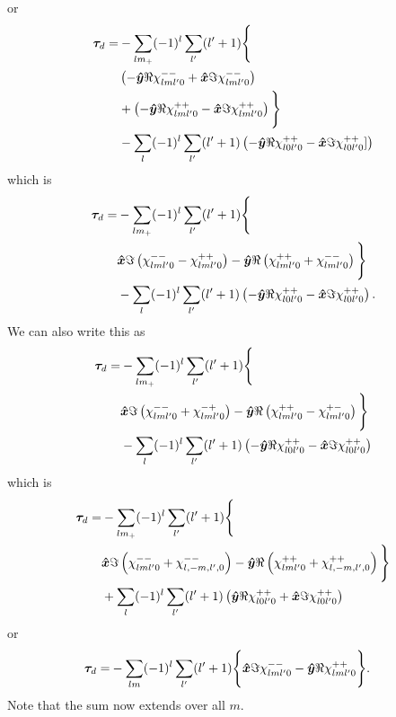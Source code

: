\documentclass[aps,twocolumn,secnumarabic,balancelastpage,amsmath,amssymb,nofootinbib,floatfix]{revtex4-1}
\begin{document}
or
\begin{equation*}
\begin{aligned}
\bm \tau_d = &-\sum_{lm_+}(-1)^l\sum_{l'}(l'+1)\Bigg\{\\
&\left( -\bm{\hat y}\Re\chi_{lml'0}^{--} + \bm{\hat x}\Im\chi_{lml'0}^{--} \right)\\
&+\left( -\bm{\hat y}\Re\chi_{lml'0}^{++}-\bm{\hat x}\Im\chi_{lml'0}^{++} \right)\Bigg\}\\
& - \sum_{l}(-1)^l \sum_{l'}(l'+1) \left( -\bm{\hat y}\Re\chi_{l0l'0}^{++} - \bm{\hat x}\Im\chi_{l0l'0}^{++}] \right)
\end{aligned}
\end{equation*}
which is
\begin{equation*}
\begin{aligned}
\bm \tau_d = &-\sum_{lm_+}(-1)^l\sum_{l'}(l'+1)\Bigg\{\\
&\bm{\hat x}\Im\left( \chi_{lml'0}^{--}-\chi_{lml'0}^{++} \right) -\bm{\hat y}\Re\left( \chi_{lml'0}^{++}+\chi_{lml'0}^{--} \right) \Bigg\}\\
& - \sum_{l}(-1)^l \sum_{l'}(l'+1) \left( -\bm{\hat y}\Re\chi_{l0l'0}^{++} - \bm{\hat x}\Im\chi_{l0l'0}^{++} \right).
\end{aligned}
\end{equation*}
We can also write this as
\begin{equation*}
\begin{aligned}
\bm \tau_d = &-\sum_{lm_+}(-1)^l\sum_{l'}(l'+1)\Bigg\{\\
&\bm{\hat x}\Im\left( \chi_{lml'0}^{--}+\chi_{lml'0}^{-+} \right) - \bm{\hat y}\Re\left( \chi_{lml'0}^{++} - \chi_{lml'0}^{+-} \right) \Bigg\}\\
& - \sum_{l}(-1)^l \sum_{l'}(l'+1) \left( -\bm{\hat y}\Re\chi_{l0l'0}^{++} - \bm{\hat x}\Im\chi_{l0l'0}^{++} \right)
\end{aligned}
\end{equation*}
which is
\begin{equation*}
\begin{aligned}
\bm \tau_d = &-\sum_{lm_+}(-1)^l\sum_{l'}(l'+1)\Bigg\{\\
&\bm{\hat x}\Im\left( \chi_{lml'0}^{--}+\chi_{l,-m,l',0}^{--} \right) - \bm{\hat y}\Re\left( \chi_{lml'0}^{++} + \chi_{l,-m,l',0}^{++} \right) \Bigg\}\\
& + \sum_{l}(-1)^l \sum_{l'}(l'+1) \left( \bm{\hat y}\Re\chi_{l0l'0}^{++} + \bm{\hat x}\Im\chi_{l0l'0}^{++} \right)
\end{aligned}
\end{equation*}
or
\begin{equation*}
\begin{aligned}
\bm \tau_d = &-\sum_{lm}(-1)^l\sum_{l'}(l'+1)\Bigg\{\bm{\hat x}\Im\chi_{lml'0}^{--} - \bm{\hat y}\Re\chi_{lml'0}^{++}\Bigg\}.
\end{aligned}
\end{equation*}
Note that the sum now extends over all $m$.
\end{document}
